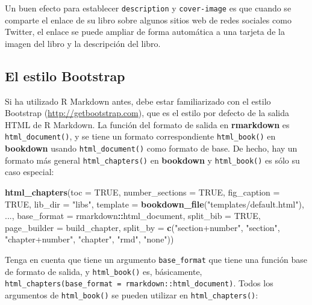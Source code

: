 \documentclass[12pt,]{krantz}
\makeatletter
\newenvironment{Shaded}{\begin{snugshade}}{\end{snugshade}}
\newcommand{\KeywordTok}[1]{\textcolor[rgb]{0.13,0.29,0.53}{\textbf{#1}}}
\newcommand{\DataTypeTok}[1]{\textcolor[rgb]{0.13,0.29,0.53}{#1}}
\newcommand{\StringTok}[1]{\textcolor[rgb]{0.31,0.60,0.02}{#1}}
\newcommand{\OtherTok}[1]{\textcolor[rgb]{0.56,0.35,0.01}{#1}}
\newcommand{\OperatorTok}[1]{\textcolor[rgb]{0.81,0.36,0.00}{\textbf{#1}}}
\newcommand{\NormalTok}[1]{#1}
\newenvironment{kframe}{%
\medskip{}
\setlength{\fboxsep}{.8em}
 \def\at@end@of@kframe{}%
 \ifinner\ifhmode%
  \def\at@end@of@kframe{\end{minipage}}%
  \begin{minipage}{\columnwidth}%
 \fi\fi%
 \def\FrameCommand##1{\hskip\@totalleftmargin \hskip-\fboxsep
 \colorbox{shadecolor}{##1}\hskip-\fboxsep
     \hskip-\linewidth \hskip-\@totalleftmargin \hskip\columnwidth}%
 \MakeFramed {\advance\hsize-\width
   \@totalleftmargin\z@ \linewidth\hsize
   \@setminipage}}%
 {\par\unskip\endMakeFramed%
 \at@end@of@kframe}
\renewenvironment{Shaded}{\begin{kframe}}{\end{kframe}}
\theoremstyle{definition}
\theoremstyle{definition}
\theoremstyle{definition}
\theoremstyle{remark}
\makeatother
\begin{document}
Un buen efecto para establecer \texttt{description} y
\texttt{cover-image} es que cuando se comparte el enlace de su libro
sobre algunos sitios web de redes sociales como Twitter, el enlace se
puede ampliar de forma automática a una tarjeta de la imagen del libro y
la descripción del libro.

\subsection{El estilo Bootstrap}\label{el-estilo-bootstrap}

Si ha utilizado R Markdown antes, debe estar familiarizado con el estilo
Bootstrap (\url{http://getbootstrap.com}), que es el estilo por defecto
de la salida HTML de R Markdown. La función del formato de salida en
\textbf{rmarkdown} es \texttt{html\_document()}, y se tiene un formato
correspondiente \texttt{html\_book()} en \textbf{bookdown} usando
\texttt{html\_document()} como formato de base. De hecho, hay un formato
más general \texttt{html\_chapters()} en \textbf{bookdown} y
\texttt{html\_book()} es sólo su caso especial:

\begin{Shaded}
\begin{Highlighting}[]
\KeywordTok{html_chapters}\NormalTok{(}\DataTypeTok{toc =} \OtherTok{TRUE}\NormalTok{, }\DataTypeTok{number_sections =} \OtherTok{TRUE}\NormalTok{,}
  \DataTypeTok{fig_caption =} \OtherTok{TRUE}\NormalTok{, }\DataTypeTok{lib_dir =} \StringTok{"libs"}\NormalTok{,}
  \DataTypeTok{template =} \KeywordTok{bookdown_file}\NormalTok{(}\StringTok{"templates/default.html"}\NormalTok{),}
\NormalTok{  ..., }\DataTypeTok{base_format =}\NormalTok{ rmarkdown}\OperatorTok{::}\NormalTok{html_document,}
  \DataTypeTok{split_bib =} \OtherTok{TRUE}\NormalTok{, }\DataTypeTok{page_builder =}\NormalTok{ build_chapter,}
  \DataTypeTok{split_by =} \KeywordTok{c}\NormalTok{(}\StringTok{"section+number"}\NormalTok{, }\StringTok{"section"}\NormalTok{, }\StringTok{"chapter+number"}\NormalTok{, }\StringTok{"chapter"}\NormalTok{, }\StringTok{"rmd"}\NormalTok{, }\StringTok{"none"}\NormalTok{))}
\end{Highlighting}
\end{Shaded}

Tenga en cuenta que tiene un argumento \texttt{base\_format} que tiene
una función base de formato de salida, y \texttt{html\_book()} es,
básicamente,
\texttt{html\_chapters(base\_format\ =\ rmarkdown::html\_document)}.
Todos los argumentos de \texttt{html\_book()} se pueden utilizar en
\texttt{html\_chapters()}:
\end{document}
